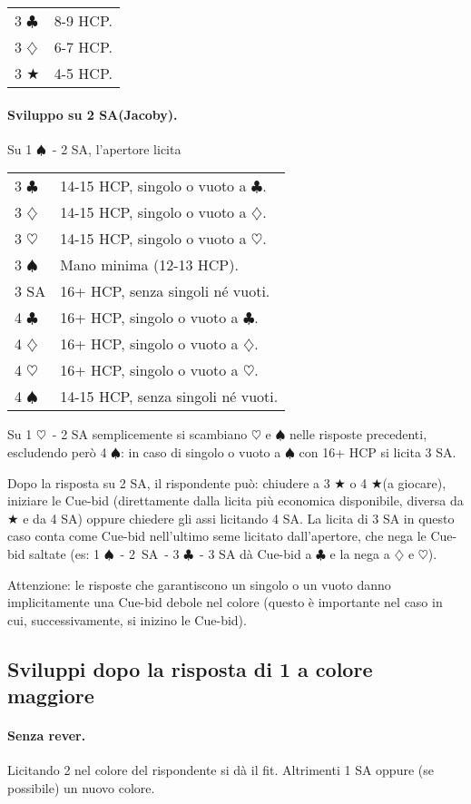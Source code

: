 \documentclass[a4paper,10pt]{article}
\renewcommand{\c}{$\clubsuit$\xspace}
\renewcommand{\d}{$\diamondsuit$\xspace}
\newcommand{\h}{$\heartsuit$\xspace}
\newcommand{\s}{$\spadesuit$\xspace}
\renewcommand{\j}{$\bigstar$\xspace}
\newcommand{\sa}{SA\xspace}
\newcommand{\smallspace}{\vskip0.3cm}
\newenvironment{twocol}
  {\smallspace\noindent\begin{tabular}{l p{0.78\textwidth}}}
  {\end{tabular}\smallspace}
\begin{document}
\begin{twocol}
	3 \c & 8-9 HCP. \\
	3 \d & 6-7 HCP. \\
	3 \j & 4-5 HCP.
\end{twocol}

\paragraph{Sviluppo su 2 \sa (Jacoby).} Su 1 \s\ - 2 \sa, l'apertore licita
\begin{twocol}
	3 \c & 14-15 HCP, singolo o vuoto a \c.\\
	3 \d & 14-15 HCP, singolo o vuoto a \d.\\
	3 \h & 14-15 HCP, singolo o vuoto a \h.\\
	3 \s & Mano minima (12-13 HCP).\\
	3 \sa & 16+ HCP, senza singoli né vuoti.\\
	4 \c & 16+ HCP, singolo o vuoto a \c.\\
	4 \d & 16+ HCP, singolo o vuoto a \d.\\
	4 \h & 16+ HCP, singolo o vuoto a \h.\\
	4 \s & 14-15 HCP, senza singoli né vuoti.
\end{twocol}

\noindent Su 1 \h\ - 2 \sa semplicemente si scambiano \h e \s nelle risposte precedenti, escludendo però 4 \s: in caso di singolo o vuoto a \s con 16+ HCP si licita 3 \sa.

Dopo la risposta su 2 \sa, il rispondente può: chiudere a 3 \j o 4 \j (a giocare), iniziare le Cue-bid (direttamente dalla licita più economica disponibile, diversa da \j e da 4 \sa) oppure chiedere gli assi licitando 4 \sa. La licita di 3 \sa in questo caso conta come Cue-bid nell'ultimo seme licitato dall'apertore, che nega le Cue-bid saltate (es: 1 \s\ - \mbox{2 \sa}\ - 3 \c\ - 3 \sa dà Cue-bid a \c e la nega a \d e \h).

Attenzione: le risposte che garantiscono un singolo o un vuoto danno implicitamente una Cue-bid debole nel colore (questo è importante nel caso in cui, successivamente, si inizino le Cue-bid).


\subsection{Sviluppi dopo la risposta di 1 a colore maggiore}

\paragraph{Senza rever.} Licitando 2 nel colore del rispondente si dà il fit. Altrimenti 1 \sa oppure (se possibile) un nuovo colore.
\end{document}
